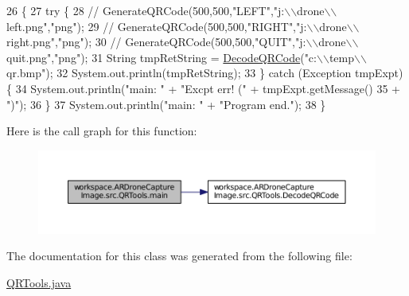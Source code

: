 \begin{DoxyCode}
26                                            \{
27         \textcolor{keywordflow}{try} \{
28             \textcolor{comment}{// GenerateQRCode(500,500,"LEFT","j:\(\backslash\)\(\backslash\)drone\(\backslash\)\(\backslash\)left.png","png");}
29             \textcolor{comment}{// GenerateQRCode(500,500,"RIGHT","j:\(\backslash\)\(\backslash\)drone\(\backslash\)\(\backslash\)right.png","png");}
30             \textcolor{comment}{// GenerateQRCode(500,500,"QUIT","j:\(\backslash\)\(\backslash\)drone\(\backslash\)\(\backslash\)quit.png","png");}
31             String tmpRetString = \hyperlink{classworkspace_1_1_a_r_drone_capture_image_1_1src_1_1_q_r_tools_a0be4c483192776f45ff0fae15c54a870}{DecodeQRCode}(\textcolor{stringliteral}{"c:\(\backslash\)\(\backslash\)temp\(\backslash\)\(\backslash\)qr.bmp"});
32             System.out.println(tmpRetString);
33         \} \textcolor{keywordflow}{catch} (Exception tmpExpt) \{
34             System.out.println(\textcolor{stringliteral}{"main: "} + \textcolor{stringliteral}{"Excpt err! ("} + tmpExpt.getMessage()
35                     + \textcolor{stringliteral}{")"});
36         \}
37         System.out.println(\textcolor{stringliteral}{"main: "} + \textcolor{stringliteral}{"Program end."});
38     \}
\end{DoxyCode}


Here is the call graph for this function\+:\nopagebreak
\begin{figure}[H]
\begin{center}
\leavevmode
\includegraphics[width=350pt]{classworkspace_1_1_a_r_drone_capture_image_1_1src_1_1_q_r_tools_a5da88f900e9713adc3e24bac2b46b679_cgraph}
\end{center}
\end{figure}




The documentation for this class was generated from the following file\+:\begin{DoxyCompactItemize}
\item 
\hyperlink{_q_r_tools_8java}{Q\+R\+Tools.\+java}\end{DoxyCompactItemize}

